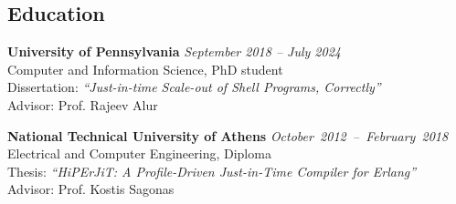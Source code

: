 \documentclass[margin]{res}
\begin{document}
\begin{resume}


\section{Education}
\hypertarget{sec:education}{}

\textbf{University of Pennsylvania} \hfill {\em September 2018 -- July 2024}\\
Computer and Information Science, PhD student \\
Dissertation: \textit{``Just-in-time Scale-out of Shell Programs, Correctly''} \\
Advisor: Prof. Rajeev Alur


\textbf{National Technical University of Athens} \hfill \mbox{\em October 2012 -- February 2018}\\
Electrical and Computer Engineering, Diploma \\ %
Thesis: \textit{``HiPErJiT: A Profile-Driven Just-in-Time Compiler for Erlang''} \\
Advisor: Prof. Kostis Sagonas 



\end{resume}
\end{document}
